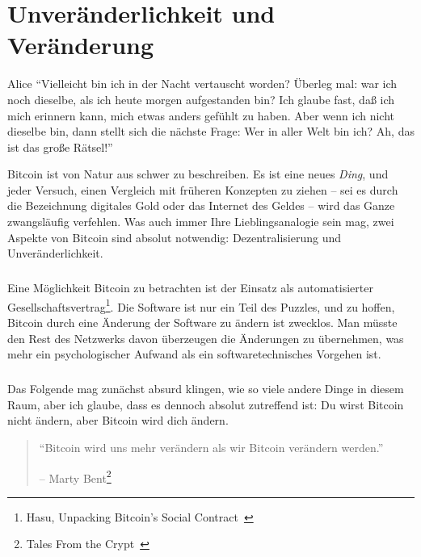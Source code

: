\chapter{Unveränderlichkeit und Veränderung}
\label{les:1}

\begin{chapquote}{Alice}
\enquote{Vielleicht bin ich in der Nacht vertauscht worden? Überleg mal: war ich
noch dieselbe, als ich heute morgen aufgestanden bin? Ich glaube fast, daß ich
mich erinnern kann, mich etwas anders gefühlt zu haben. Aber wenn ich nicht
dieselbe bin, dann stellt sich die nächste Frage: Wer in aller Welt bin ich? Ah,
das ist das große Rätsel!}
\end{chapquote}

Bitcoin ist von Natur aus schwer zu beschreiben. Es ist eine neues
\textit{Ding}, und jeder Versuch, einen Vergleich mit früheren Konzepten zu
ziehen – sei es durch die Bezeichnung digitales Gold oder das Internet des
Geldes – wird das Ganze zwangsläufig verfehlen. Was auch immer Ihre
Lieblingsanalogie sein mag, zwei Aspekte von Bitcoin sind absolut notwendig:
Dezentralisierung und Unveränderlichkeit.

\paragraph{}
Eine Möglichkeit Bitcoin zu betrachten ist der Einsatz als automatisierter
Gesellschaftsvertrag\footnote{Hasu, Unpacking Bitcoin's Social
Contract~\cite{social-contract}}. Die Software ist nur ein Teil des Puzzles, und
zu hoffen, Bitcoin durch eine Änderung der Software zu ändern ist zwecklos. Man
müsste den Rest des Netzwerks davon überzeugen die Änderungen zu übernehmen, was
mehr ein psychologischer Aufwand als ein softwaretechnisches Vorgehen ist.

\paragraph{}
Das Folgende mag zunächst absurd klingen, wie so viele andere Dinge in diesem
Raum, aber ich glaube, dass es dennoch absolut zutreffend ist: Du wirst Bitcoin
nicht ändern, aber Bitcoin wird dich ändern.

\begin{quotation}\begin{samepage}
\enquote{Bitcoin wird uns mehr verändern als wir Bitcoin verändern werden.}
\begin{flushright} -- Marty Bent\footnote{Tales From the Crypt~\cite{tftc21}}
\end{flushright}\end{samepage}\end{quotation}

